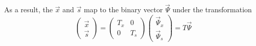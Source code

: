\documentclass[10pt]{iopart}
\begin{document}
As a result, the $\vec x$ and $\vec s$ map to the binary vector $\vec \Psi$ under the transformation
\begin{equation}
    \label{eq:bit-vector-mapping}
    \begin{pmatrix}
        \vec x \\ \vec s
    \end{pmatrix}
    =
    \begin{pmatrix}
        T_x & 0 \\ 0 & T_s
    \end{pmatrix}
    \begin{pmatrix}
        \vec \Psi_x \\ \vec \Psi_s
    \end{pmatrix}
    =
    T
    \vec \Psi
\end{equation}
\end{document}
